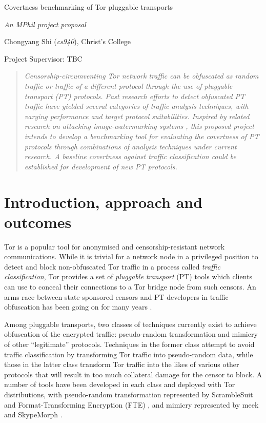 \documentclass[11pt]{article}
\begin{document}
\centerline{\Large Covertness benchmarking of Tor pluggable transports}
\vspace{2em}
\centerline{\Large \emph{An MPhil project proposal}}
\vspace{2em}
\centerline{\large Chongyang Shi (\emph{cs940}), Christ's College}
\vspace{1em}
\centerline{\large Project Supervisor: TBC}
\vspace{1em}

\begin{abstract}
\textsl{Censorship-circumventing Tor network traffic can be obfuscated as random traffic or traffic of a different protocol through the use of pluggable transport (PT) protocols. Past research efforts to detect obfuscated PT traffic have yielded several categories of traffic analysis techniques, with varying performance and target protocol suitabilities. Inspired by related research on attacking image-watermarking systems \cite{petitcolas1998attacks}, this proposed project intends to develop a benchmarking tool for evaluating the covertness of PT protocols through combinations of analysis techniques under current research. A baseline covertness against traffic classification could be established for development of new PT protocols.} 
\end{abstract}

\section{Introduction, approach and outcomes}

Tor is a popular tool for anonymised and censorship-resistant network communications. While it is trivial for a network node in a privileged position to detect and block non-obfuscated Tor traffic \cite[Tb. 6] {bujlow2015independent} in a process called \emph{traffic classification}, Tor provides a set of \emph{pluggable transport} (PT) tools which clients can use to conceal their connections to a Tor bridge node from such censors. An arms race between state-sponsored censors and PT developers in traffic obfuscation has been going on for many years \cite{khattak2014systemization}. 

Among pluggable transports, two classes of techniques currently exist to achieve obfuscation of the encrypted traffic: pseudo-random transformation and mimicry of other ``legitimate'' protocols. Techniques in the former class attempt to avoid traffic classification by transforming Tor traffic into pseudo-random data, while those in the latter class transform Tor traffic into the likes of various other protocols that will result in too much collateral damage for the censor to block. A number of tools have been developed in each class and deployed with Tor distributions, with pseudo-random transformation represented by ScrambleSuit \cite{winter2013scramblesuit} and Format-Transforming Encryption (FTE) \cite{dyer2013protocol}, and mimicry represented by meek \cite{fifield2015blocking} and SkypeMorph \cite{mohajeri2012skypemorph}. 
\end{document}
